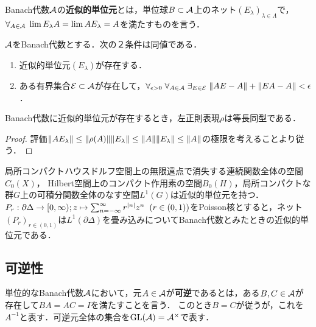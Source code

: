 \documentclass[uplatex,dvipdfmx]{jsreport}
\begin{document}
\begin{definition}
    Banach代数$\mathcal{A}$の\textbf{近似的単位元}とは，単位球$B\subset\mathcal{A}$上のネット$(E_\lambda)_{\lambda\in\Lambda}$で，$\forall_{A\in\mathcal{A}}\;\lim E_\lambda A=\lim AE_{\lambda}=A$を満たすものを言う．
\end{definition}
\begin{lemma}[近似的単位元の特徴付け]
    $\mathcal{A}$をBanach代数とする．次の２条件は同値である．
    \begin{enumerate}
        \item 近似的単位元$(E_\lambda)$が存在する．
        \item ある有界集合$\mathcal{E}\subset\mathcal{A}$が存在して，$\forall_{\epsilon>0}\;\forall_{A\in\mathcal{A}}\;\exists_{E\in\mathcal{E}}\;\|AE-A\|+\|EA-A\|<\epsilon$．
    \end{enumerate}
\end{lemma}
\begin{lemma}
    Banach代数に近似的単位元が存在するとき，左正則表現$\rho$は等長同型である．
\end{lemma}
\begin{proof}
    評価$\|AE_\lambda\|\le\|\rho(A)\|\|E_\lambda\|\le\|A\|\|E_\lambda\|\le\|A\|$の極限を考えることより従う．
\end{proof}
\begin{example}
    局所コンパクトハウスドルフ空間上の無限遠点で消失する連続関数全体の空間$C_0(X)$，
    Hilbert空間上のコンパクト作用素の空間$B_0(H)$，局所コンパクトな群$G$上の可積分関数全体のなす空間$L^1(G)$は近似的単位元を持つ．
    $P_r:\partial\Delta\to[0,\infty);z\mapsto\sum^\infty_{n=-\infty}r^{\lvert n\rvert}z^n\;\;(r\in(0,1))$をPoisson核とすると，ネット$(P_r)_{r\in(0,1)}$は$L^1(\partial\Delta)$を畳み込みについてBanach代数とみたときの近似的単位元である．
\end{example}

\subsection{可逆性}

\begin{definition}[invertible]
    単位的なBanach代数$\mathcal{A}$において，元$A\in\mathcal{A}$が\textbf{可逆}であるとは，ある$B,C\in\mathcal{A}$が存在して$BA=AC=I$を満たすことを言う．
    このとき$B=C$が従うが，これを$A^{-1}$と表す．可逆元全体の集合を$\mathrm{GL}(\mathcal{A})=\mathcal{A}^\times$で表す．
\end{definition}
\end{document}

